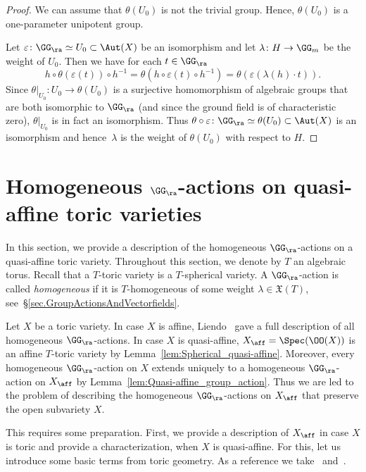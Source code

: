 \begin{proof}
We can assume that $\theta(U_0)$ is not the trivial group.
Hence, $\theta(U_0)$ is a one-parameter unipotent group.

Let $\varepsilon \colon \GG_\ra \simeq U_0 \subset \Aut(X)$
be an isomorphism and let
$\lambda \colon H \to \GG_m$ be the weight of $U_0$. Then we have for each $t \in \GG_\ra$
\[
h \circ \theta(\varepsilon(t)) \circ h^{-1} =
\theta(h \circ \varepsilon(t) \circ h^{-1}) = \theta(\varepsilon(\lambda(h)\cdot t)).
\]
Since $\theta |_{U_0} \colon U_0 \to \theta(U_0)$ is a surjective
homomorphism of algebraic groups that are both isomorphic to $\GG_\ra$ (and since the ground field is of
characteristic zero), $\theta |_{U_0}$ is in fact an isomorphism.
Thus $\theta \circ \varepsilon \colon \GG_\ra \simeq \theta(U_0) \subset \Aut(X)$ is an isomorphism
and hence~$\lambda$ is the weight of $\theta(U_0)$ with respect to $H$.
\end{proof}

\section{Homogeneous \texorpdfstring{$\GG_\ra$}{Ga}-actions on quasi-affine toric varieties}
\label{sec.homogeneou_Ga-actions_quasi-affine}

In this section, we provide a description of the homogeneous $\GG_\ra$-actions
on a quasi-affine toric variety. Throughout this section, we denote by $T$ an algebraic torus.
Recall that a $T$-toric variety is a $T$-spherical variety.
A $\GG_\ra$-action is called
\emph{homogeneous} if it is $T$-homogeneous
of some weight $\lambda \in \mathfrak{X}(T)$, see~\S\ref{sec.GroupActionsAndVectorfields}.

Let $X$ be a toric variety. In case $X$ is affine, Liendo~\cite{Li2010Affine-Bbb-T-varie}
gave a full description
of all homogeneous $\GG_\ra$-actions. In case $X$ is quasi-affine, $X_{\aff} = \Spec(\OO(X))$ is an affine
$T$-toric variety by Lemma~\ref{lem:Spherical_quasi-affine}.
Moreover, every homogeneous $\GG_\ra$-action
on $X$ extends uniquely to a homogeneous $\GG_\ra$-action on $X_{\aff}$ by Lemma~\ref{lem:Quasi-affine_group_action}.
Thus we are led to the problem of describing the homogeneous $\GG_\ra$-actions on $X_{\aff}$ that preserve
the open subvariety $X$.

This requires some preparation.
First, we provide a description of $X_{\aff}$ in case $X$ is toric and
provide a characterization, when $X$ is quasi-affine. For this, let us introduce some basic terms
from toric geometry. As a reference we take~\cite{Fu1993Introduction-to-to} and~\cite{CoLiSc2011Toric-varieties}.

